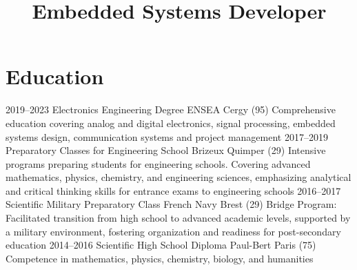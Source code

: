 \documentclass[11pt,a4paper]{moderncv}
\title{Embedded Systems Developer}
\begin{document}
\makecvtitle

\section{Education}
    \cventry
        {2019--2023}
        {Electronics Engineering Degree}
        {ENSEA}
        {Cergy (95)}
        {}
        {Comprehensive education covering analog and digital electronics, signal processing, embedded systems design, communication systems and project management}
    \cventry
        {2017--2019}
        {Preparatory Classes for Engineering School}
        {Brizeux}
        {Quimper (29)}
        {}
        {Intensive programs preparing students for engineering schools. Covering advanced mathematics, physics, chemistry, and engineering sciences, emphasizing analytical and critical thinking skills for entrance exams to  engineering schools}   
    \cventry
        {2016--2017}
        {Scientific Military Preparatory Class}
        {French Navy}
        {Brest (29)}
        {}
        {Bridge Program: Facilitated transition from high school to advanced academic levels, supported by a military environment, fostering organization and readiness for post-secondary education}  
    \cventry
        {2014--2016}
        {Scientific High School Diploma}
        {Paul-Bert}
        {Paris (75)}
        {}
        {Competence in mathematics, physics, chemistry, biology, and humanities} 
        
\end{document}
